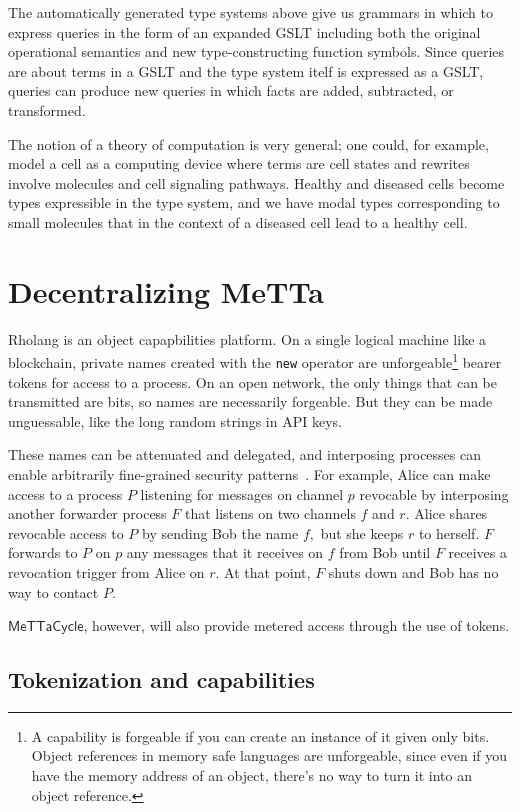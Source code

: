 \documentclass{article}
\newcommand{\MC}{\mathsf{MeTTaCycle}}
\begin{document}
The automatically generated type systems above give us grammars in which to express queries in the form of an expanded GSLT including both the original operational semantics and new type-constructing function symbols. Since queries are about terms in a GSLT and the type system itelf is expressed as a GSLT, queries can produce new queries in which facts are added, subtracted, or transformed.

The notion of a theory of computation is very general; one could, for example, model a cell as a computing device where terms are cell states and rewrites involve molecules and cell signaling pathways.  Healthy and diseased cells become types expressible in the type system, and we have modal types corresponding to small molecules that in the context of a diseased cell lead to a healthy cell.

\section{Decentralizing MeTTa}

Rholang is an object capapbilities platform.  On a single logical machine like a blockchain, private names created with the \verb+new+ operator are unforgeable\footnote{A capability is forgeable if you can create an instance of it given only bits. Object references in memory safe languages are unforgeable, since even if you have the memory address of an object, there's no way to turn it into an object reference.} bearer tokens for access to a process.  On an open network, the only things that can be transmitted are bits, so names are necessarily forgeable.  But they can be made unguessable, like the long random strings in API keys.

These names can be attenuated and delegated, and interposing processes can enable arbitrarily fine-grained security patterns~\cite{Stiegler2004}.  For example, Alice can make access to a process $P$ listening for messages on channel $p$ revocable by interposing another forwarder process $F$ that listens on two channels $f$ and $r$.  Alice shares revocable access to $P$ by sending Bob the name $f,$ but she keeps $r$ to herself.  $F$ forwards to $P$ on $p$ any messages that it receives on $f$ from Bob until $F$ receives a revocation trigger from Alice on $r$.  At that point, $F$ shuts down and Bob has no way to contact $P$.

$\MC$, however, will also provide metered access through the use of tokens.

\subsection{Tokenization and capabilities}
\label{Security model}
\end{document}
